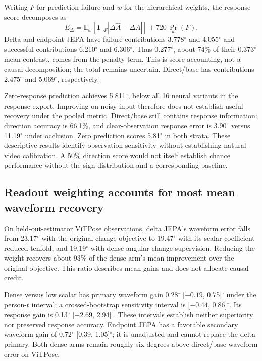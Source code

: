 \documentclass{article}
\newcommand{\degunit}{^{\circ}}
\begin{document}
Writing $F$ for prediction failure and $w$ for the hierarchical weights, the response score decomposes as
\begin{equation}
\overline E_\Delta=\mathbb E_w[\mathbf1_{\neg F}|\Delta\widehat A-\Delta A|]+720\,\Pr_w(F).
\label{eq:failure}
\end{equation}
Delta and endpoint JEPA have failure contributions 3.778$\degunit$ and 4.055$\degunit$ and successful contributions 6.210$\degunit$ and 6.306$\degunit$. Thus 0.277$\degunit$, about 74\% of their 0.373$\degunit$ mean contrast, comes from the penalty term. This is score accounting, not a causal decomposition; the total remains uncertain. Direct/base has contributions 2.475$\degunit$ and 5.069$\degunit$, respectively.

Zero-response prediction achieves 5.811$\degunit$, below all 16 neural variants in the response export. Improving on noisy input therefore does not establish useful recovery under the pooled metric. Direct/base still contains response information: direction accuracy is 66.1\%, and clear-observation response error is 3.90$\degunit$ versus 11.19$\degunit$ under occlusion. Zero prediction scores 5.81$\degunit$ in both strata. These descriptive results identify observation sensitivity without establishing natural-video calibration. A 50\% direction score would not itself establish chance performance without the sign distribution and a corresponding baseline.

\clearpage
\subsection{Readout weighting accounts for most mean waveform recovery}
On held-out-estimator ViTPose observations, delta JEPA's waveform error falls from 23.17$\degunit$ with the original change objective to 19.47$\degunit$ with its scalar coefficient reduced tenfold, and 19.19$\degunit$ with dense angular-change supervision. Reducing the weight recovers about 93\% of the dense arm's mean improvement over the original objective. This ratio describes mean gains and does not allocate causal credit.



Dense versus low scalar has primary waveform gain 0.28$\degunit$ [${-0.19}$, 0.75]$\degunit$ under the person-$t$ interval; a crossed-bootstrap sensitivity interval is [${-0.44}$, 0.86]$\degunit$. Its response gain is 0.13$\degunit$ [${-2.69}$, 2.94]$\degunit$. These intervals establish neither superiority nor preserved response accuracy. Endpoint JEPA has a favorable secondary waveform gain of 0.72$\degunit$ [0.39, 1.05]$\degunit$; it is unadjusted and cannot replace the delta primary. Both dense arms remain roughly six degrees above direct/base waveform error on ViTPose.
\end{document}
